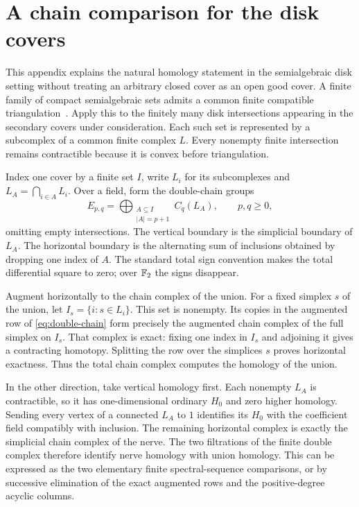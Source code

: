 \section{A chain comparison for the disk covers}
\label{app:nerve}
This appendix explains the natural homology statement in the semialgebraic disk setting without treating an arbitrary closed cover as an open good cover. A finite family of compact semialgebraic sets admits a common finite compatible triangulation~\cite{realalgebraic,bauer}. Apply this to the finitely many disk intersections appearing in the secondary covers under consideration. Each such set is represented by a subcomplex of a common finite complex $L$. Every nonempty finite intersection remains contractible because it is convex before triangulation.

Index one cover by a finite set $I$, write $L_i$ for its subcomplexes and $L_A=\bigcap_{i\in A}L_i$. Over a field, form the double-chain groups
\begin{equation}\label{eq:double-chain}
E_{p,q}=\bigoplus_{\substack{A\subseteq I\\|A|=p+1}}C_q(L_A),\qquad p,q\ge0,
\end{equation}
omitting empty intersections. The vertical boundary is the simplicial boundary of $L_A$. The horizontal boundary is the alternating sum of inclusions obtained by dropping one index of $A$. The standard total sign convention makes the total differential square to zero; over $\mathbb F_2$ the signs disappear.

Augment horizontally to the chain complex of the union. For a fixed simplex $s$ of the union, let $I_s=\{i:s\in L_i\}$. This set is nonempty. Its copies in the augmented row of \cref{eq:double-chain} form precisely the augmented chain complex of the full simplex on $I_s$. That complex is exact: fixing one index in $I_s$ and adjoining it gives a contracting homotopy. Splitting the row over the simplices $s$ proves horizontal exactness. Thus the total chain complex computes the homology of the union.

In the other direction, take vertical homology first. Each nonempty $L_A$ is contractible, so it has one-dimensional ordinary $H_0$ and zero higher homology. Sending every vertex of a connected $L_A$ to $1$ identifies its $H_0$ with the coefficient field compatibly with inclusion. The remaining horizontal complex is exactly the simplicial chain complex of the nerve. The two filtrations of the finite double complex therefore identify nerve homology with union homology. This can be expressed as the two elementary finite spectral-sequence comparisons, or by successive elimination of the exact augmented rows and the positive-degree acyclic columns.

